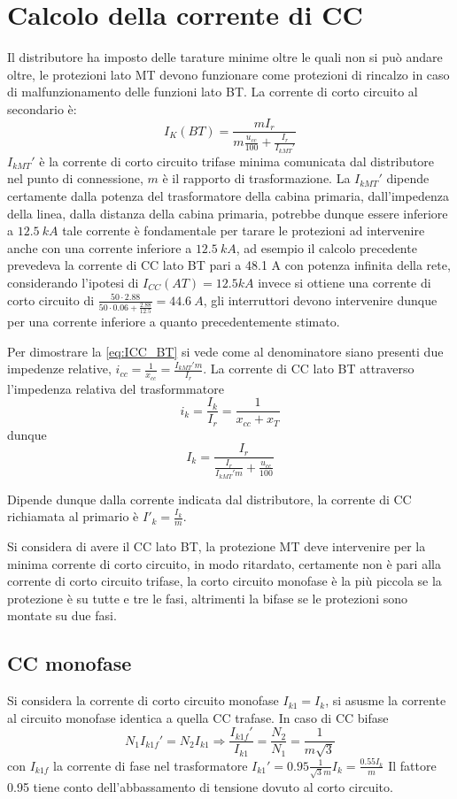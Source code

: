 \section{Calcolo della corrente di CC}
Il distributore ha imposto delle tarature minime oltre le quali non si può 
andare oltre, le protezioni lato MT devono funzionare come protezioni di 
rincalzo in caso di malfunzionamento delle funzioni lato BT.
La corrente di corto circuito al secondario è:
\begin{equation}I_K(BT) = \frac{mI_r}{m\frac{u_{cc}}{100}+ \frac{I_r}{I_{kMT}'}}
\label{eq:ICC_BT}
\end{equation}
$I_{kMT}'$ è la corrente di corto circuito trifase minima comunicata dal 
distributore nel punto di connessione, $m$ è il rapporto di trasformazione.
La $I_{kMT}'$ dipende certamente dalla potenza del trasformatore della cabina 
primaria, dall'impedenza della linea, dalla distanza della cabina primaria, 
potrebbe dunque essere inferiore a $12.5\ kA$ tale corrente è fondamentale per 
tarare le protezioni ad intervenire anche con una corrente inferiore a $12.5\ kA$, ad esempio il calcolo precedente prevedeva la corrente di CC lato BT pari 
a 48.1 A con potenza infinita della rete, considerando l'ipotesi di $I_{CC}(AT)=12.5 kA$ invece si ottiene una corrente di corto circuito di $\frac{50\cdot 2.88}{50\cdot0.06+\frac{2.88}{12.5}} = 44.6\ A$, gli interruttori devono 
intervenire dunque per una corrente inferiore a quanto precedentemente stimato.

Per dimostrare la \ref{eq:ICC_BT} si vede come al denominatore siano presenti 
due impedenze relative, $i_{cc} = \frac{1}{x_{cc}} = \frac{I_{kMT}' m }{I_r}$.
La corrente di CC lato BT attraverso l'impedenza relativa del trasformmatore 
$$
i_k = \frac{I_k}{I_r} = \frac{1}{x_{cc} + x_T}
$$
dunque
$$
I_k  = \frac{I_r}{\frac{I_r}{I_{kMT}'m}+ \frac{u_{cc}}{100}}
$$

Dipende dunque dalla corrente indicata dal distributore, la corrente di CC richiamata al primario è $I'_k = \frac{I_k}{m}$.

Si considera di avere il CC lato BT, la protezione MT deve intervenire per la 
minima corrente di corto circuito, in modo ritardato, certamente non è pari 
alla corrente di corto circuito trifase, la corto circuito monofase è la più 
piccola se la protezione è su tutte e tre le fasi, altrimenti la bifase se le 
protezioni sono montate su due fasi.

\subsection{CC monofase}
Si considera la corrente di corto circuito monofase $I_{k1} = I_k$, si asusme 
la corrente al circuito monofase identica a quella CC trafase.
In caso di CC bifase
$$
N_1 I_{k1f}' = N_2 I_{k1} \Rightarrow \frac{I_{k1f}'}{I_{k1}} = \frac{N_2}{N_1} = \frac{1}{m\sqrt{3}}
$$
con $I_{k1f}$ la corrente di fase nel trasformatore
$I_{k1}'= 0.95\frac{1}{\sqrt{3}m}I_k = \frac{0.55 I_k}{m}$
Il fattore 0.95 tiene conto dell'abbassamento di tensione dovuto al corto 
circuito.

